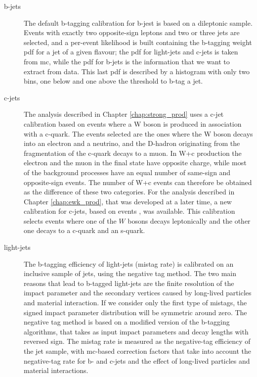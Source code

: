 \begin{description}

\item[b-jets] The default b-tagging calibration for b-jest is based on a \ttbar dileptonic sample. Events with exactly two opposite-sign leptons
and two or three jets are selected, and a per-event likelihood is built containing the b-tagging weight \gls{pdf} for a jet of a given flavour;
the \gls{pdf} for light-jets and c-jets is taken from \gls{mc}, while the \gls{pdf} for b-jets is the information that we want to extract from data.
This last \gls{pdf} is described by a histogram with only two bins, one below and one above the threshold to b-tag a jet. 


\item[c-jets] The analysis described in Chapter \ref{chap:strong_prod} uses a c-jet calibration based on events where a W boson 
is produced in association with a c-quark. The events selected are the ones where the W boson decays into an electron and a neutrino,
and the D-hadron originating from the fragmentation of the c-quark decays to a muon. 
In W+c production the electron and the muon in the final state have opposite charge, 
while most of the background processes have an equal number of same-sign and opposite-sign events. The number of W+c events can therefore 
be obtained as the difference of these two categories.
For the analysis described in Chapter \ref{chap:ewk_prod}, that was developed at a later time, a new calibration for c-jets, 
based on \ttbar events \cite{ATLAS:2018bpl}, was available. 
This calibration selects \ttbar events where one of the $W$ bosons decays leptonically and the other one decays to a c-quark and an s-quark. 

\item[light-jets] The b-tagging efficiency of light-jets (mistag rate) is calibrated on an inclusive sample of jets, using the negative tag method.
The two main reasons that lead to b-tagged light-jets are the finite resolution of the impact parameter and the secondary vertices caused
by long-lived particles and material interaction. If we consider only the first type of mistags, the signed impact parameter distribution 
will be symmetric around zero. 
The negative tag method is based on a modified version of the b-tagging algorithms, that takes as input impact parameters and decay lengths with
reversed sign. The mistag rate is measured as the negative-tag efficiency of the jet sample, with \gls{mc}-based correction factors that take into account 
the negative-tag rate for b- and c-jets and the effect of long-lived particles and material interactions.

\end{description}

